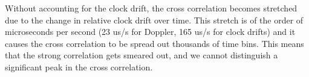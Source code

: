 Without accounting for the clock drift, the cross correlation becomes stretched due to the change in relative clock drift over time. This stretch is of the order of microseconds per second (23 us/s for Doppler, 165 us/s for clock drifts) and it causes the cross correlation to be spread out thousands of time bins. This means that the strong correlation gets smeared out, and we cannot distinguish a significant peak in the cross correlation.

